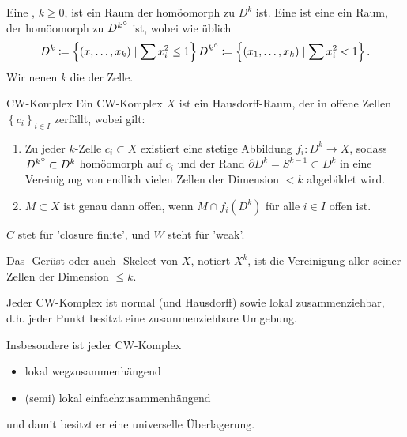\begin{definition}[$k$-Zelle]\label{def:k-zelle}
    Eine ,  $k\geq 0$, ist ein Raum der homöomorph zu $D^k$ ist. Eine  ist eine ein Raum, der homöomorph zu ${D^k}^\circ$  ist, wobei wie üblich
    \[
        D^k \coloneqq  \left \{(x,\ldots,x_k) \mid  \sum x_i ^2 \leq  1\right\} \\
        {D^k}^\circ \coloneqq  \left \{(x_1,\ldots,x_k) \mid  \sum x_i^2 < 1\right\} 
    .\] 
    Wir nenen $k$ die   der Zelle. 
\end{definition}

\begin{definition}{CW-Komplex}\label{def:cw-komplex}
    Ein CW-Komplex  $X$ ist ein Hausdorff-Raum, der in offene Zellen  $\left \{c_i\right\} _{i \in I}$ zerfällt, wobei gilt:
    \begin{enumerate}[1.]
        \item Zu jeder $k$-Zelle  $c_i \subset X$ existiert eine stetige Abbildung $f_i \colon  D^k \to  X$, sodass ${D^k}^\circ \subset D^k$ homöomorph auf $c_i$ und der Rand  $\partial D^k = S^{k-1} \subset D^k$ in eine Vereinigung von endlich vielen Zellen der Dimension $<k$ abgebildet wird. 
        \item $M\subset X$ ist genau dann offen, wenn $M \cap f_i(D^k)$ für alle $i\in I$ offen ist.
    \end{enumerate}
\end{definition}

\begin{oral}
    $C$ stet für 'closure finite', und  $W$ steht für 'weak'.
\end{oral}

\begin{dnotation}
    Das -Gerüst oder auch -Skeleet von $X$, notiert  $X^k$, ist die Vereinigung aller seiner Zellen der Dimension  $\leq k$.  
\end{dnotation}

\begin{remark}
    Jeder CW-Komplex ist normal (und Hausdorff) sowie lokal zusammenziehbar, d.h. jeder Punkt besitzt eine zusammenziehbare Umgebung.

    Insbesondere ist jeder CW-Komplex
    \begin{itemize}
        \item lokal wegzusammenhängend
        \item (semi) lokal einfachzusammenhängend
    \end{itemize}
    und damit besitzt er eine universelle Überlagerung.
\end{remark}


